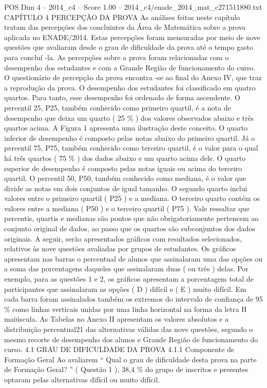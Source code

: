 \begin{textsample}{POS Dim 4 – 2014\_c4 – Score 1.00 – 2014\_c4/enade\_2014\_mat\_c271511880.txt}  \label{ex:f4_pos_209}
CAPÍTULO 4 PERCEPÇÃO DA PROVA As análises feitas neste capítulo tratam das percepções dos concluintes da Área de Matemática sobre a prova aplicada no ENADE/2014.
Estas percepções foram mensuradas por meio de nove questões que avaliaram desde o grau de dificuldade da prova até o tempo gasto para concluí -la.
As percepções sobre a prova foram relacionadas com o desempenho dos estudantes e com a Grande Região de funcionamento do curso.
O questionário de percepção da prova encontra -se ao final do Anexo IV, que traz a reprodução da prova.
O desempenho dos estudantes foi classificado em quatro quartos.
Para tanto, esse desempenho foi ordenado de forma ascendente.
O percentil 25, P25, também conhecido como primeiro quartil, é a nota de desempenho que deixa um quarto ( 25 \% ) dos valores observados abaixo e três quartos acima.
A Figura 1 apresenta uma ilustração deste conceito.
O quarto inferior de desempenho é composto pelas notas abaixo do primeiro quartil.
Já o percentil 75, P75, também conhecido como terceiro quartil, é o valor para o qual há três quartos ( 75 \% ) dos dados abaixo e um quarto acima dele.
O quarto superior de desempenho é composto pelas notas iguais ou acima do terceiro quartil.
O percentil 50, P50, também conhecido como mediana, é o valor que divide as notas em dois conjuntos de igual tamanho.
O segundo quarto inclui valores entre o primeiro quartil ( P25 ) e a mediana.
O terceiro quarto contém os valores entre a mediana ( P50 ) e o terceiro quartil ( P75 ).
Vale ressaltar que percentis, quartis e medianas são pontos que não obrigatoriamente pertencem ao conjunto original de dados, ao passo que os quartos são subconjuntos dos dados originais.
A seguir, serão apresentados gráficos com resultados selecionados, relativos às nove questões avaliadas por grupos de estudantes.
Os gráficos apresentam nas barras o percentual de alunos que assinalaram uma das opções ou a soma das porcentagens daqueles que assinalaram duas ( ou três ) delas.
Por exemplo, para as questões 1 e 2, os gráficos apresentam a porcentagem total de participantes que assinalaram as opções ( D ) difícil e ( E ) muito difícil.
Em cada barra foram assinalados também os extremos do intervalo de confiança de 95 \% como linhas verticais unidas por uma linha horizontal na forma da letra H maiúscula.
As Tabelas no Anexo II apresentam os valores absolutos e a distribuição percentual21 das alternativas válidas das nove questões, segundo o mesmo recorte de desempenho dos alunos e Grande Região de funcionamento do curso. 4.1 GRAU DE DIFICULDADE DA PROVA 4.1.1 Componente de Formação Geral Ao avaliarem “ Qual o grau de dificuldade desta prova na parte de Formação Geral? ” ( Questão 1 ), 38,4 \% do grupo de inscritos e presentes optaram pelas alternativas difícil ou muito difícil.

\end{textsample}
